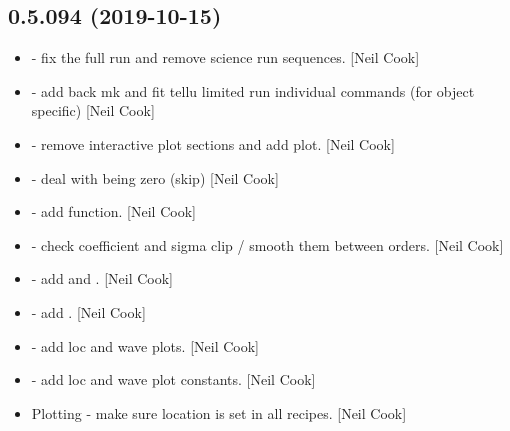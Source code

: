 \documentclass[a4paper,10pt,english]{report}
\begin{document}
\subsection{0.5.094 (2019-10-15)}
\label{\detokenize{misc/changelog:id48}}\begin{itemize}
\item {} 
 - fix the full run and
remove science run sequences. {[}Neil Cook{]}

\item {} 
 - add back mk and fit
tellu limited run individual commands (for object specific) {[}Neil
Cook{]}

\item {} 
 - remove interactive plot sections and add
 plot. {[}Neil Cook{]}

\item {} 
 - deal with  being zero (skip) {[}Neil
Cook{]}

\item {} 
 - add  function. {[}Neil Cook{]}

\item {} 
 - check coefficient and sigma clip /
smooth them between orders. {[}Neil Cook{]}

\item {} 
 - add  and
. {[}Neil Cook{]}

\item {} 
 - add . {[}Neil Cook{]}

\item {} 
 - add loc and wave
plots. {[}Neil Cook{]}

\item {} 
 - add loc and wave plot
constants. {[}Neil Cook{]}

\item {} 
Plotting - make sure location is set in all recipes. {[}Neil Cook{]}

\end{itemize}
\end{document}
